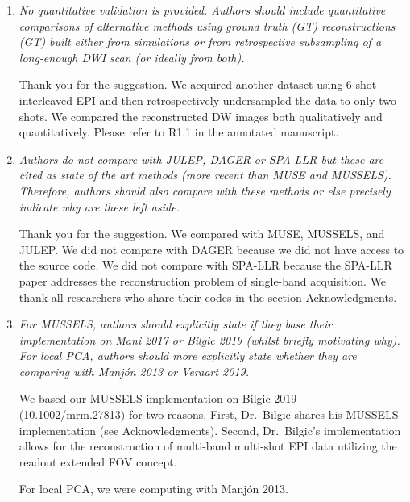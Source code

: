 \documentclass[a4paper,11pt,twoside]{report}
\begin{document}
\begin{enumerate}
    \item \textit{No quantitative validation is provided. Authors should include quantitative comparisons of alternative methods using ground truth (GT) reconstructions (GT) built either from simulations or from retrospective subsampling of a long-enough DWI scan (or ideally from both).}

    \hspace{1em} Thank you for the suggestion.
    We acquired another dataset using 6-shot interleaved EPI
    and then retrospectively undersampled the data to only two shots.
    We compared the reconstructed DW images
    both qualitatively and quantitatively.
    Please refer to R1.1 in the annotated manuscript.

    \item \textit{Authors do not compare with JULEP, DAGER or SPA-LLR but these are cited as state of the art methods (more recent than MUSE and MUSSELS). Therefore, authors should also compare with these methods or else precisely indicate why are these left aside.}

    \hspace{1em} Thank you for the suggestion.
    We compared with MUSE, MUSSELS, and JULEP.
    We did not compare with DAGER
    because we did not have access to the source code.
    We did not compare with SPA-LLR because
    the SPA-LLR paper addresses the reconstruction problem
    of single-band acquisition.
    We thank all researchers who share their codes
    in the section Acknowledgments.

    \item \textit{For MUSSELS, authors should explicitly state if they base their implementation on Mani 2017 or Bilgic 2019 (whilst briefly motivating why). For local PCA, authors should more explicitly state whether they are comparing with Manjón 2013 or Veraart 2019.}

    \hspace{1em} We based our MUSSELS implementation on
    Bilgic 2019 (\href{https://doi.org/10.1002/mrm.27813}{10.1002/mrm.27813}) for two reasons.
    First, Dr.~Bilgic shares his MUSSELS implementation
    (see Acknowledgments).
    Second, Dr.~Bilgic's implementation allows for the reconstruction of
    multi-band multi-shot EPI data
    utilizing the readout extended FOV concept.

    \hspace{1em} For local PCA, we were computing with Manjón 2013.


\end{enumerate}
\end{document}
